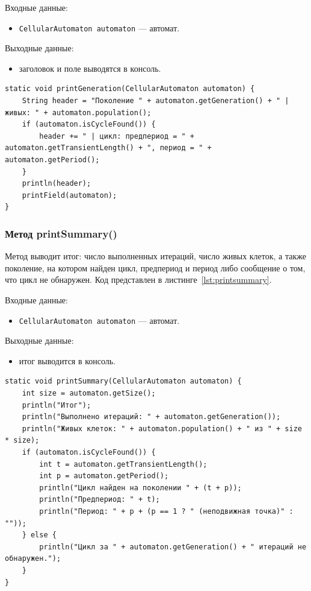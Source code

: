 Входные данные:
\begin{itemize}
	\item \texttt{CellularAutomaton automaton} --- автомат.
\end{itemize}

Выходные данные:
\begin{itemize}
	\item заголовок и поле выводятся в консоль.
\end{itemize}

\begin{lstlisting}[caption={Метод printGeneration()}, label={lst:printgen}]
static void printGeneration(CellularAutomaton automaton) {
	String header = "Поколение " + automaton.getGeneration() + " | живых: " + automaton.population();
	if (automaton.isCycleFound()) {
		header += " | цикл: предпериод = " + automaton.getTransientLength() + ", период = " + automaton.getPeriod();
	}
	println(header);
	printField(automaton);
}
\end{lstlisting}

\subsubsection*{Метод printSummary()}

Метод выводит итог: число выполненных итераций, число живых клеток, а также поколение, на котором найден цикл, предпериод и период либо сообщение о том, что цикл не обнаружен. Код представлен в листинге~\ref{lst:printsummary}.

Входные данные:
\begin{itemize}
	\item \texttt{CellularAutomaton automaton} --- автомат.
\end{itemize}

Выходные данные:
\begin{itemize}
	\item итог выводится в консоль.
\end{itemize}

\begin{lstlisting}[caption={Метод printSummary()}, label={lst:printsummary}]
static void printSummary(CellularAutomaton automaton) {
	int size = automaton.getSize();
	println("Итог");
	println("Выполнено итераций: " + automaton.getGeneration());
	println("Живых клеток: " + automaton.population() + " из " + size * size);
	if (automaton.isCycleFound()) {
		int t = automaton.getTransientLength();
		int p = automaton.getPeriod();
		println("Цикл найден на поколении " + (t + p));
		println("Предпериод: " + t);
		println("Период: " + p + (p == 1 ? " (неподвижная точка)" : ""));
	} else {
		println("Цикл за " + automaton.getGeneration() + " итераций не обнаружен.");
	}
}
\end{lstlisting}
